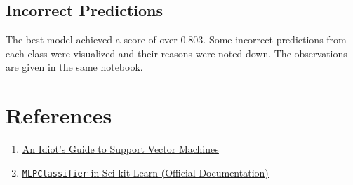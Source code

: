 \documentclass[12pt]{article}
\begin{document}
    \subsection*{Incorrect Predictions}
    The best model achieved a score of over 0.803. Some incorrect predictions from each class
    were visualized and their reasons were noted down. The observations are given in the
    same notebook.

    \section*{References}
    \begin{enumerate}
        \item \href{https://web.mit.edu/6.034/wwwbob/svm-notes-long-08.pdf}{\color{blue}\underline{An Idiot's Guide to Support Vector Machines}}
        \item \href{https://scikit-learn.org/stable/modules/generated/sklearn.neural_network.MLPClassifier.html}{\color{blue}\underline{\texttt{MLPClassifier} in Sci-kit Learn (Official Documentation)}}
    \end{enumerate}
\end{document}
